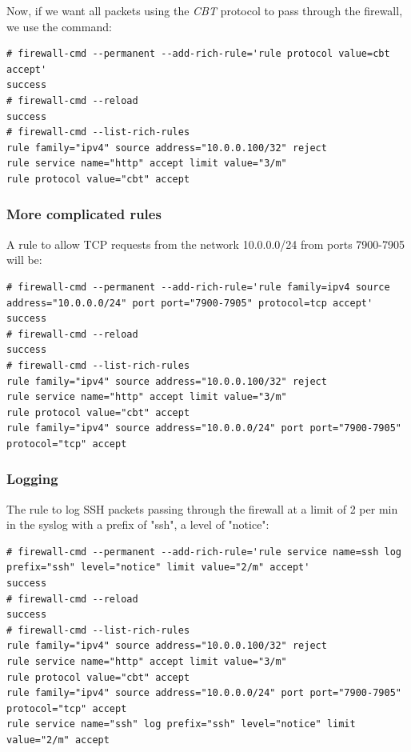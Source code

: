 \noindent
Now, if we want all packets using the \textit{CBT} protocol to pass through the firewall, we use the command:

\vspace{-15pt}
\begin{verbatim}
# firewall-cmd --permanent --add-rich-rule='rule protocol value=cbt accept'
success
# firewall-cmd --reload
success
# firewall-cmd --list-rich-rules 
rule family="ipv4" source address="10.0.0.100/32" reject
rule service name="http" accept limit value="3/m"
rule protocol value="cbt" accept
\end{verbatim}
\vspace{-10pt}	

\subsubsection{More complicated rules}	
A rule to allow TCP requests from the network 10.0.0.0/24 from ports 7900-7905 will be:

\vspace{-15pt}
\begin{verbatim}
# firewall-cmd --permanent --add-rich-rule='rule family=ipv4 source address="10.0.0.0/24" port port="7900-7905" protocol=tcp accept'
success
# firewall-cmd --reload
success
# firewall-cmd --list-rich-rules 
rule family="ipv4" source address="10.0.0.100/32" reject
rule service name="http" accept limit value="3/m"
rule protocol value="cbt" accept
rule family="ipv4" source address="10.0.0.0/24" port port="7900-7905" protocol="tcp" accept
\end{verbatim}
\vspace{-10pt}	

\subsubsection{Logging}
\vspace{-10pt}
The rule to log SSH packets passing through the firewall at a limit of 2 per min in the syslog with a prefix of "ssh", a level of "notice":

\vspace{-15pt}
\begin{verbatim}
# firewall-cmd --permanent --add-rich-rule='rule service name=ssh log prefix="ssh" level="notice" limit value="2/m" accept'
success
# firewall-cmd --reload
success
# firewall-cmd --list-rich-rules 
rule family="ipv4" source address="10.0.0.100/32" reject
rule service name="http" accept limit value="3/m"
rule protocol value="cbt" accept
rule family="ipv4" source address="10.0.0.0/24" port port="7900-7905" protocol="tcp" accept
rule service name="ssh" log prefix="ssh" level="notice" limit value="2/m" accept
\end{verbatim}
\vspace{-10pt}	

